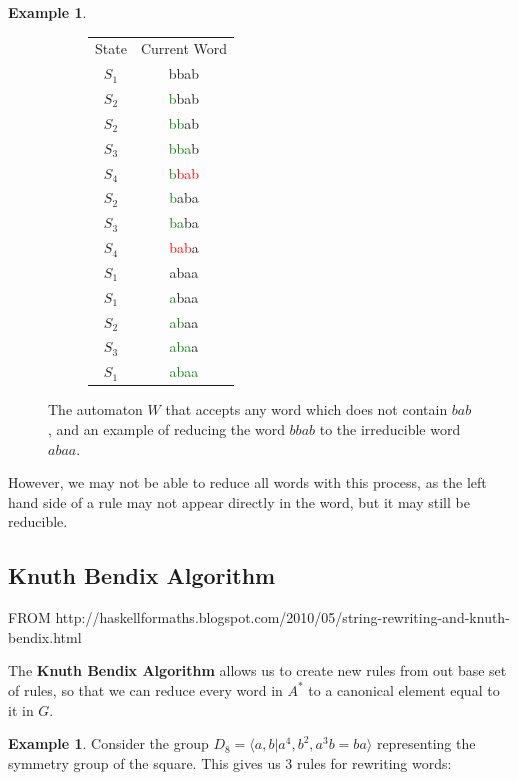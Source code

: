 \documentclass[10pt]{article}
\theoremstyle{plain}
\theoremstyle{definition}
\newtheorem{example}[theorem]{Example}
\theoremstyle{definition}
\theoremstyle{definition}
\begin{document}
\begin{multicols}{2}
\begin{example}
\begin{figure}[t]
\begin{subfigure}{.5\textwidth}
			\label{fig5:sub1}
		\end{subfigure}%
		\begin{subfigure}{.3\textwidth}
			\begin{tabular}{c c}
				State	&	Current Word \\
				$S_1$	&	bbab \\
				$S_2$	&	\textcolor{green}{b}bab \\
				$S_2$	&	\textcolor{green}{bb}ab \\
				$S_3$	&	\textcolor{green}{bba}b \\
				$S_4$	&	\textcolor{green}{b}\textcolor{red}{bab} \\
				$S_2$	&	\textcolor{green}{b}aba \\
				$S_3$	&	\textcolor{green}{ba}ba \\
				$S_4$	&	\textcolor{red}{bab}a \\
				$S_1$	&	abaa \\
				$S_1$	&	\textcolor{green}{a}baa \\
				$S_2$	&	\textcolor{green}{ab}aa \\
				$S_3$	&	\textcolor{green}{aba}a \\
				$S_1$ & 	\textcolor{green}{abaa} \\
			\end{tabular}
		\end{subfigure}%
		\caption{The automaton $W$ that accepts any word which does not contain $bab$, and an example of reducing the word $bbab$ to the irreducible word $abaa$.}
	\end{figure}
\end{example}

However, we may not be able to reduce all words with this process, as the left hand side of a rule may not appear directly in the word, but it may still be reducible.

\subsection{Knuth Bendix Algorithm}

FROM http://haskellformaths.blogspot.com/2010/05/string-rewriting-and-knuth-bendix.html

The \textbf{Knuth Bendix Algorithm} allows us to create new rules from out base set of rules, so that we can reduce every word in $A^*$ to a canonical element equal to it in $G$.

\begin{example}
	Consider the group $D_8 = \langle a, b | a^4, b^2, a^3 b = ba \rangle$ representing the symmetry group of the square. This gives us 3 rules for rewriting words:


\end{example}
\end{multicols}
\end{document}
